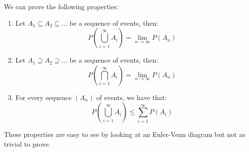 \documentclass[10pt]{extarticle}
\begin{document}
We can prove the following properties:
\begin{enumerate}
    \item Let $A_1 \subseteq A_2 \subseteq \dots$ be a sequence of events, then:
          $$
              P\left(\bigcup_{i=1}^\infty A_i\right) = \lim_{n \to \infty} P(A_n)
          $$
    \item Let $A_1 \supseteq A_2 \supseteq \dots$ be a sequence of events, then:
          $$
              P\left(\bigcap_{i=1}^\infty A_i\right) = \lim_{n \to \infty} P(A_n)
          $$
    \item For every sequence $(A_n)$ of events, we have that:
          $$
              P(\bigcup_{i=1}^\infty A_i) \le \sum_{i=1}^\infty P(A_i)
          $$
\end{enumerate}

These properties are easy to see by looking at an Euler-Venn diagram but not as trivial to prove.
\end{document}
